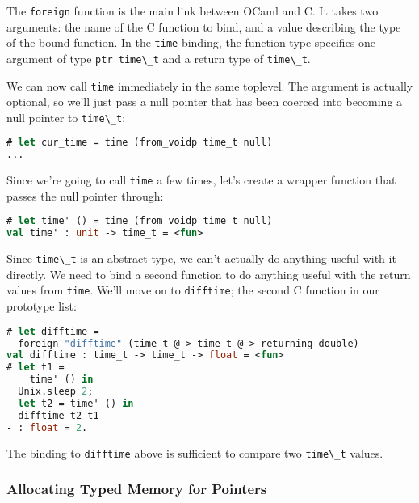 The \passthrough{\lstinline!foreign!} function is the main link between
OCaml and C. It takes two arguments: the name of the C function to bind,
and a value describing the type of the bound function. In the
\passthrough{\lstinline!time!} binding, the function type specifies one
argument of type \passthrough{\lstinline!ptr time\_t!} and a return type
of \passthrough{\lstinline!time\_t!}.

We can now call \passthrough{\lstinline!time!} immediately in the same
toplevel. The argument is actually optional, so we'll just pass a null
pointer that has been coerced into becoming a null pointer to
\passthrough{\lstinline!time\_t!}:

\begin{lstlisting}[language=Caml]
# let cur_time = time (from_voidp time_t null)
...
\end{lstlisting}

Since we're going to call \passthrough{\lstinline!time!} a few times,
let's create a wrapper function that passes the null pointer through:

\begin{lstlisting}[language=Caml]
# let time' () = time (from_voidp time_t null)
val time' : unit -> time_t = <fun>
\end{lstlisting}

Since \passthrough{\lstinline!time\_t!} is an abstract type, we can't
actually do anything useful with it directly. We need to bind a second
function to do anything useful with the return values from
\passthrough{\lstinline!time!}. We'll move on to
\passthrough{\lstinline!difftime!}; the second C function in our
prototype list:

\begin{lstlisting}[language=Caml]
# let difftime =
  foreign "difftime" (time_t @-> time_t @-> returning double)
val difftime : time_t -> time_t -> float = <fun>
# let t1 =
    time' () in
  Unix.sleep 2;
  let t2 = time' () in
  difftime t2 t1
- : float = 2.
\end{lstlisting}

The binding to \passthrough{\lstinline!difftime!} above is sufficient to
compare two \passthrough{\lstinline!time\_t!} values.

\hypertarget{allocating-typed-memory-for-pointers}{%
\subsubsection{Allocating Typed Memory for
Pointers}\label{allocating-typed-memory-for-pointers}}

